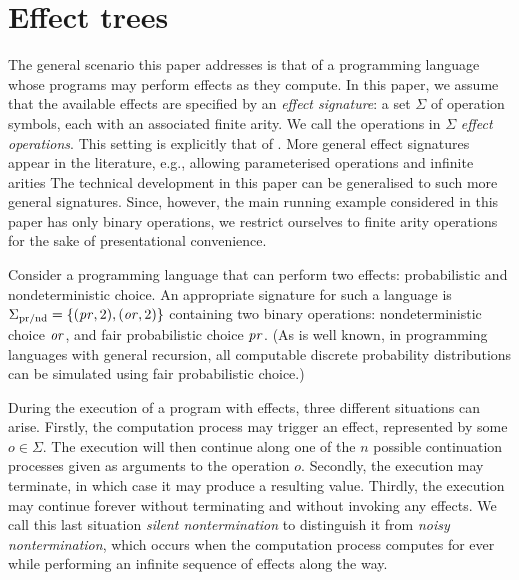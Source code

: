 \section{Effect trees}
\label{section:trees}

The general scenario this paper addresses is that of a programming language whose programs may perform effects as they compute. In this paper, we assume that the available effects are  specified 
by  an \emph{effect signature}: a set $\Sigma$ of operation symbols, each with an associated finite arity. We call the operations in $\Sigma$ \emph{effect operations}. This setting is explicitly that of \cite{plotkin2001adequacy}.
More general effect signatures appear in the literature, e.g., allowing parameterised operations and infinite arities
\cite{gom}  The technical development in this paper can be generalised to such
more general signatures. Since, however, the main running example considered in this paper has only binary operations, we restrict ourselves to finite arity operations 
for the sake of presentational convenience. %
\begin{example}
\label{example:prnd}
    Consider a programming language that can perform two effects: probabilistic and nondeterministic choice.
    An appropriate signature for such a language is 
    $\Sigma_{\text{pr/nd}} = \{ (\operatorname{\mathit{pr}},2), (\operatorname{\mathit{or}},2) \}$ containing two binary operations:
    nondeterministic choice $\operatorname{\mathit{or}}$, 
    and fair probabilistic choice $\operatorname{\mathit{pr}}$. (As is well known, in programming languages with general recursion, all computable discrete probability distributions can be 
     simulated using fair probabilistic choice.)
 \end{example}

During the execution of a program with effects, three different situations can arise. Firstly, the computation process may
trigger an effect, represented by some $o \in \Sigma$. The execution will then continue along one of the $n$ possible continuation processes given as arguments to the operation $o$. Secondly, the execution may terminate, 
in which case it may produce a resulting value. 
Thirdly, the execution may continue forever without terminating and without invoking any effects. We call this last situation
 \emph{silent nontermination} to distinguish it from \emph{noisy nontermination}, which occurs
 when the computation process computes for ever while performing an infinite sequence of effects along the way.

